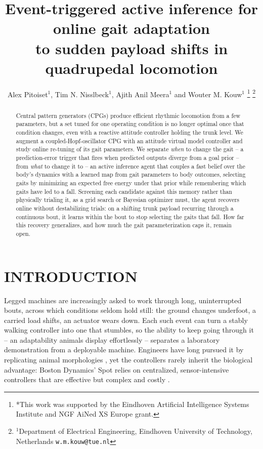 \documentclass[letterpaper, 10 pt, conference]{ieeeconf}  %
\title{\LARGE \bf
Event-triggered active inference for online gait adaptation\\ to sudden payload shifts in quadrupedal locomotion
}
\author{Alex Pitoiset$^{1}$, Tim N. Nisslbeck$^{1}$, Ajith Anil Meera$^{1}$ and Wouter M. Kouw$^{1}$%
\thanks{*This work was supported by the Eindhoven Artificial Intelligence Systems Institute and NGF AiNed XS Europe grant.}%
\thanks{$^{1}$Department of Electrical Engineering,
        Eindhoven University of Technology, Netherlands
        {\tt\small w.m.kouw@tue.nl}}%
}
\begin{document}
\maketitle
\thispagestyle{empty}
\pagestyle{empty}


\begin{abstract}
Central pattern generators (CPGs) produce efficient rhythmic locomotion from a few parameters, but a set tuned for one operating condition is no longer optimal once that condition changes, even with a reactive attitude controller holding the trunk level.
We augment a coupled-Hopf-oscillator CPG with an attitude virtual model controller and study online re-tuning of its gait parameters.
We separate \emph{when} to change the gait -- a prediction-error trigger that fires when predicted outputs diverge from a goal prior -- from \emph{what} to change it to -- an active inference agent that couples a fast belief over the body's dynamics with a learned map from gait parameters to body outcomes, selecting gaits by minimizing an expected free energy under that prior while remembering which gaits have led to a fall.
Screening each candidate against this memory rather than physically trialing it, as a grid search or Bayesian optimizer must, the agent recovers online without destabilizing trials: on a shifting trunk payload recurring through a continuous bout, it learns within the bout to stop selecting the gaits that fall.
How far this recovery generalizes, and how much the gait parameterization caps it, remain open.
\end{abstract}


\section{INTRODUCTION}


Legged machines are increasingly asked to work through long, uninterrupted bouts, across which conditions seldom hold still: the ground changes underfoot, a carried load shifts, an actuator wears down. Each such event can turn a stably walking controller into one that stumbles, so the ability to keep going through it -- an adaptability animals display effortlessly -- separates a laboratory demonstration from a deployable machine. Engineers have long pursued it by replicating animal morphologies \cite{pettersen2017snake, dwivedula2025configbot}, yet the controllers rarely inherit the biological advantage: Boston Dynamics' Spot relies on centralized, sensor-intensive controllers that are effective but complex and costly \cite{dwivedula2025configbot}.
\end{document}
